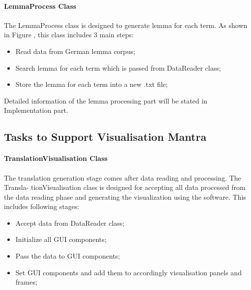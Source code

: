 \paragraph{LemmaProcess Class}

\paragraph[]{}
The LemmaProcess class is designed to generate lemma for each term. As shown in Figure \label{lemma}, this class includes 3 main steps:
\begin{itemize}
	\item \textbf{}Read data from German lemma corpus;
	\item \textbf{}Search lemma for each term which is passed from DataReader class;
	\item \textbf{}Store the lemma for each term into a new .txt file;
\end{itemize} 
Detailed information of the lemma processing part will be stated in Implementation part. 

\subsection{Tasks to Support Visualisation Mantra}

\paragraph{TranslationVisualisation Class}

\paragraph[]{}The translation generation stage comes after data reading and processing. The Transla- tionVisualisation class is designed for accepting all data processed from the data reading phase and generating the visualization using the software. This includes following stages:
\begin{itemize}
	\item \textbf{}Accept data from DataReader class;
	\item \textbf{}Initialize all GUI components;
	\item \textbf{}Pass the data to GUI components;
	\item \textbf{}Set GUI components and add them to accordingly visualisation panels and frames;

\end{itemize}  

